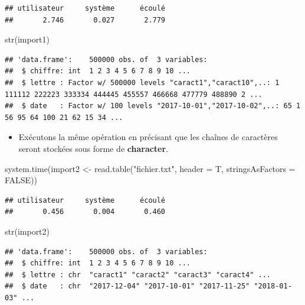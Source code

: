 \documentclass[
]{book}
\newenvironment{Shaded}{\begin{snugshade}}{\end{snugshade}}
\newcommand{\AttributeTok}[1]{\textcolor[rgb]{0.77,0.63,0.00}{#1}}
\newcommand{\ConstantTok}[1]{\textcolor[rgb]{0.00,0.00,0.00}{#1}}
\newcommand{\FunctionTok}[1]{\textcolor[rgb]{0.00,0.00,0.00}{#1}}
\newcommand{\NormalTok}[1]{#1}
\newcommand{\OtherTok}[1]{\textcolor[rgb]{0.56,0.35,0.01}{#1}}
\newcommand{\StringTok}[1]{\textcolor[rgb]{0.31,0.60,0.02}{#1}}
\providecommand{\tightlist}{%
  \setlength{\itemsep}{0pt}\setlength{\parskip}{0pt}}
\theoremstyle{definition}
\theoremstyle{definition}
\theoremstyle{definition}
\theoremstyle{definition}
\theoremstyle{remark}
\begin{document}
\begin{verbatim}
## utilisateur     système      écoulé 
##       2.746       0.027       2.779
\end{verbatim}

\begin{Shaded}
\begin{Highlighting}[]
\FunctionTok{str}\NormalTok{(import1)}
\end{Highlighting}
\end{Shaded}

\begin{verbatim}
## 'data.frame':    500000 obs. of  3 variables:
##  $ chiffre: int  1 2 3 4 5 6 7 8 9 10 ...
##  $ lettre : Factor w/ 500000 levels "caract1","caract10",..: 1 111112 222223 333334 444445 455557 466668 477779 488890 2 ...
##  $ date   : Factor w/ 100 levels "2017-10-01","2017-10-02",..: 65 1 56 95 64 100 21 62 15 34 ...
\end{verbatim}

\begin{itemize}
\tightlist
\item
  Exécutons la même opération en précisant que les chaînes de caractères seront stockées sous forme de \textbf{character}.
\end{itemize}

\begin{Shaded}
\begin{Highlighting}[]
\FunctionTok{system.time}\NormalTok{(import2 }\OtherTok{\textless{}{-}} \FunctionTok{read.table}\NormalTok{(}\StringTok{"fichier.txt"}\NormalTok{, }\AttributeTok{header =}\NormalTok{ T,}
                                  \AttributeTok{stringsAsFactors =} \ConstantTok{FALSE}\NormalTok{))}
\end{Highlighting}
\end{Shaded}

\begin{verbatim}
## utilisateur     système      écoulé 
##       0.456       0.004       0.460
\end{verbatim}

\begin{Shaded}
\begin{Highlighting}[]
\FunctionTok{str}\NormalTok{(import2)}
\end{Highlighting}
\end{Shaded}

\begin{verbatim}
## 'data.frame':    500000 obs. of  3 variables:
##  $ chiffre: int  1 2 3 4 5 6 7 8 9 10 ...
##  $ lettre : chr  "caract1" "caract2" "caract3" "caract4" ...
##  $ date   : chr  "2017-12-04" "2017-10-01" "2017-11-25" "2018-01-03" ...
\end{verbatim}
\end{document}
